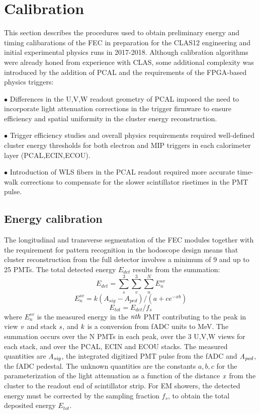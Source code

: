 \section{Calibration}

This section describes the procedures used to obtain preliminary energy and timing calibarations of the FEC in preparation for the CLAS12 engineering and initial experimental physics runs in 2017-2018.  Although calibration algorithms were already honed from experience with CLAS, some additional complexity was introduced by the addition of PCAL and the requirements of the FPGA-based physics triggers: 

$\bullet$ Differences in the U,V,W readout geometry of PCAL imposed the need to incorporate light attenuation corrections in the trigger firmware to ensure efficiency and spatial uniformity in the cluster energy reconstruction.

$\bullet$ Trigger efficiency studies and overall physics requirements required well-defined cluster energy thresholds for both electron and MIP triggers in each calorimeter layer (PCAL,ECIN,ECOU).

$\bullet$ Introduction of WLS fibers in the PCAL readout required more accurate time-walk corrections to compensate for the slower scintillator risetimes in the PMT pulse.

\subsection{Energy calibration}
The longitudinal and transverse segmentation of the FEC modules together with the requirement for pattern recognition in the hodoscope design means that cluster reconstruction from the full detector involves a minimum of 9 and up to 25 PMTs.  The total detected energy $E_{det}$ results from the summation:
\begin{equation}
 E_{det} = \sum_{s}^{3} \sum_{v}^{3} \sum_{n}^{N} E_{n}^{sv}\label{eq:E1}
\end{equation}
\begin{equation}
 E_{n}^{sv} = k(A_{sig}-A_{ped})/(a+c e^{-xb})   \label{eq:E2}
\end{equation}
\begin{equation}
 E_{tot} = E_{det}/f_{s}                 \label{eq:E3}
\end{equation}
where $E_{n}^{sv}$ is the measured energy in the $\it{nth}$ PMT contributing to the peak 
in view $\it{v}$ and stack $\it{s}$, and $\it{k}$ is a conversion from fADC units to MeV.  The summation occurs over the N PMTs in each peak, over the 3 U,V,W views for each stack, and over the PCAL, ECIN and ECOU stacks.  The measured quantities are $\it{A_{sig}}$, the integrated digitized PMT pulse from the fADC and $\it{A_{ped}}$, the fADC pedestal.  The unknown quantities are the constants $a,b,c$ for the parameterization of the light attenuation as a function of the distance $\it{x}$ from the cluster to the readout end of scintillator strip. For EM showers, the detected energy must be corrected by the sampling fraction $f_{s}$, to obtain the total deposited energy $E_{tot}$.  

